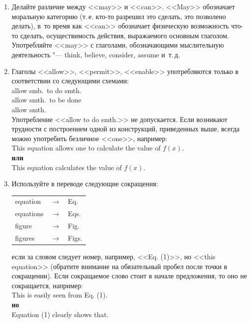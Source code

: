 \documentclass[a5paper, 10pt, twoside, numbers=enddot]{scrartcl}
\newcommand{\etc}{и~т.\,д.\xspace}
\newcommand{\ie}{т.\,е.\xspace}
\begin{document}
\begin{enumerate}
  \item Делайте различие между <<may>> и <<can>>. <<May>> обозначает моральную категорию (\ie кто-то
    разрешил это сделать, это позволено делать), в~то время как <<can>> обозначает физическую
    возможность что-то сделать, осу\-ществимость действия, выражаемого основным глаголом. Употребляйте
    <<may>> с глаголами, обозначающими мыслительную деятельность "--- think, believe, consider,
    assume \etc

  \item Глаголы <<allow>>, <<permit>>, <<enable>> употребляются только в соответствии со следующими
    схемами:\\ [4pt] \textsf{
      allow smb.\ to do smth.\\
      allow smth.\ to be done\\
      allow smth.\\ [4pt]}
    Употребление <<allow to do smth.>> не допускается. Если возникают трудности с построением одной
    из конструкций, приведенных выше, всегда можно употребить безличное <<one>>, например:\\ [4pt]
    \textsf{
      This equation allows one to calculate the value of $f(x)$.\\ [4pt]
      \textbf{или}\\ [4pt]
      This equation calculates the value of $f(x)$.
    }

  \item Используйте в переводе следующие сокращения:
    \begin{center}
      \sffamily
      \begin{tabular}{lll}
        equation  & $\rightarrow$ & Eq.\\
        equations & $\rightarrow$ & Eqs.\\
        figure    & $\rightarrow$ & Fig.\\
        figures   & $\rightarrow$ & Figs.\\
      \end{tabular}
    \end{center}
    если за словом следует номер, например, <<Eq. (1)>>, но <<this equation>> (обратите внимание на
    обязательный пробел после точки в сокращении). Если сокращаемое слово стоит в начале предложения,
    то оно не сокращается, например:\\ [4pt]
    \textsf{
      This is easily seen from Eq. (1).\\ [4pt]
      \textbf{но}\\ [4pt]
      Equation (1) clearly shows that.
    }


\end{enumerate}
\end{document}
